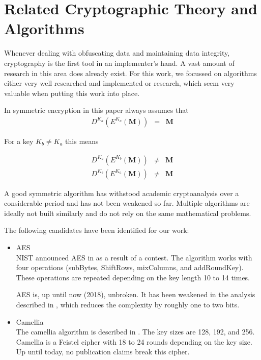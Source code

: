 \chapter{Related Cryptographic Theory and Algorithms}

Whenever dealing with obfuscating data and maintaining data integrity, cryptography is the first tool in an implementer's hand. A vast amount of research in this area does already exist. For this work, we focussed on algorithms either very well researched and implemented or research, which seem very valuable when putting this work into place. 

In symmetric encryption in this paper always assumes that
\begin{eqnarray}
	D^{K_a}\left(E^{K_a}\left(\mathbf{M}\right)\right) & = & \mathbf{M}
\end{eqnarray} 

For a key $K_b\neq K_a$ this means

\begin{eqnarray}
	D^{K_a}\left(E^{K_b}\left(\mathbf{M}\right)\right) & \neq & \mathbf{M}\\
	D^{K_b}\left(E^{K_a}\left(\mathbf{M}\right)\right) & \neq & \mathbf{M}
\end{eqnarray} 

A good symmetric algorithm has withstood academic cryptoanalysis over a considerable period and has not been weakened so far. Multiple algorithms are ideally not built similarly and do not rely on the same mathematical problems.

The following candidates have been identified for our work:
\begin{itemize}
	\item AES\\
	NIST announced AES in \citeyear{standard2001announcing} as a result of a contest. The algorithm works with four operations (subBytes, ShiftRows, mixColumns, and addRoundKey). These operations are repeated depending on the key length 10 to 14 times. 
	
	AES is, up until now (2018), unbroken. It has been weakened in the analysis described in \cite{tao2015improving}, which reduces the complexity by roughly one to two bits. 
	
	\item Camellia\\
	The camellia algorithm is described in \cite{rfc3713}. The key sizes are 128, 192, and 256. Camellia is a Feistel cipher with 18 to 24 rounds depending on the key size. Up until today, no publication claims break this cipher. 
\end{itemize}


